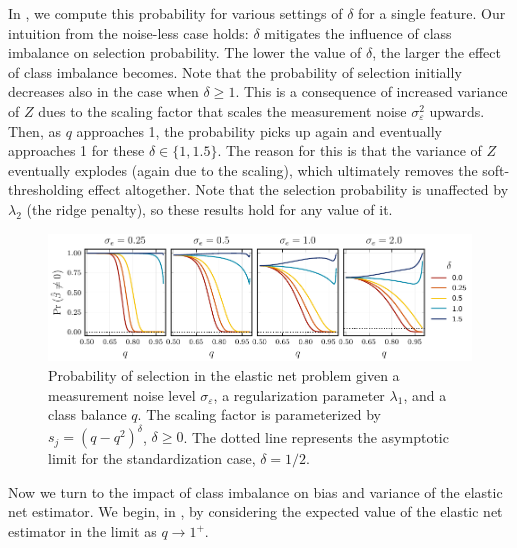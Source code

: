 In , we compute this probability for various settings of \(\delta\) for a single feature. Our intuition from the noise-less case holds: \(\delta\) mitigates the influence of class imbalance on selection probability. The lower the value of \(\delta\), the larger the effect of class imbalance becomes. Note that the probability of selection initially decreases also in the case when \(\delta \geq 1\). This is a consequence of increased variance of \(Z\) dues to the scaling factor that scales the measurement noise \(\sigma_\varepsilon^2\) upwards. Then, as \(q\) approaches 1, the probability picks up again and eventually approaches 1 for these \(\delta \in \{1, 1.5\}\). The reason for this is that the variance of \(Z\) eventually explodes (again due to the scaling), which ultimately removes the soft-thresholding effect altogether. Note that the selection probability is unaffected by \(\lambda_2\) (the ridge penalty), so these results hold for any value of it.

\begin{figure}[htpb]
  \centering
  \includegraphics[]{plots/selection_probability.pdf}
  \caption{%
    Probability of selection in the elastic net problem given a measurement noise level \(\sigma_\varepsilon\), a regularization parameter \(\lambda_1\), and a class balance \(q\). The scaling factor is parameterized by \(s_j = (q - q^2)^\delta\), \(\delta \geq 0\). The dotted line represents the asymptotic limit for the standardization case, \(\delta = 1/2\).}
  \label{fig:selection-probability}
\end{figure}

Now we turn to the impact of class imbalance on bias and variance of the elastic net estimator. We begin, in , by considering the expected value of the elastic net estimator in the limit as \(q \rightarrow 1^+\).

